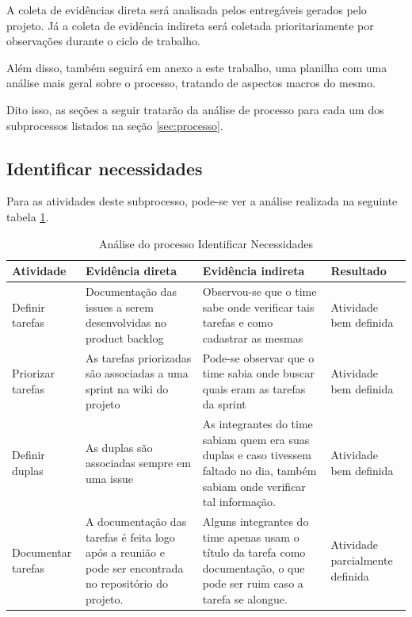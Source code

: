 \documentclass[a4paper, 11pt]{article}
\begin{document}
A coleta de evidências direta será analisada pelos entregáveis gerados pelo
projeto. Já a coleta de evidência indireta será coletada prioritariamente por
observações durante o ciclo de trabalho.

Além disso, também seguirá em anexo a este trabalho, uma planilha com uma
análise mais geral sobre o processo, tratando de aspectos macros do mesmo.

Dito isso, as seções a seguir tratarão da análise de processo para cada um dos
subprocessos listados na seção \ref{sec:processo}.

\subsection*{Identificar necessidades}

Para as atividades deste subprocesso, pode-se ver a análise realizada na
seguinte tabela \ref{tab:necessidades}.

\begin{table}[]
\centering
\caption{Análise do processo Identificar Necessidades}
\label{tab:necessidades}
\begin{tabularx}{\textwidth}{|X|X|X|X|}
\hline
Atividade & Evidência direta & Evidência indireta & Resultado \\ \hline
\multicolumn{1}{|l|}{Definir tarefas} & Documentação das issues a serem desenvolvidas no product backlog & Observou-se que o time sabe onde verificar tais tarefas e como cadastrar as mesmas & Atividade bem definida \\ \hline
\multicolumn{1}{|l|}{Priorizar tarefas} & As tarefas priorizadas são associadas a uma sprint na wiki do projeto & Pode-se observar que o time sabia onde buscar quais eram as tarefas da sprint & Atividade bem definida \\ \hline
\multicolumn{1}{|l|}{Definir duplas} & As duplas são associadas sempre em uma issue & As integrantes do time sabiam quem era suas duplas e caso tivessem faltado no dia, também sabiam onde verificar tal informação. & Atividade bem definida \\ \hline
\multicolumn{1}{|l|}{Documentar tarefas} & A documentação das tarefas é feita logo após a reunião e pode ser encontrada no repositório do projeto. & Alguns integrantes do time apenas usam o título da tarefa como documentação, o que pode ser ruim caso a tarefa se alongue. & Atividade parcialmente definida \\ \hline
\end{tabularx}
\end{table}
\end{document}
